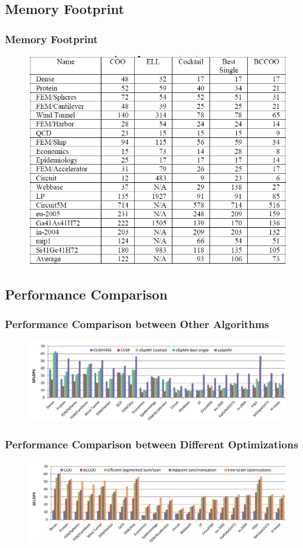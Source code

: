 \subsection{Memory Footprint}
\begin{frame}
	\frametitle{Memory Footprint}
	\begin{figure}
		\includegraphics[scale=0.4]{figure/fig6-memoryprint.png}
	\end{figure}
\end{frame}

\subsection{Performance Comparison}
\begin{frame}
	\frametitle{Performance Comparison between Other Algorithms}
	\begin{figure}
		\includegraphics[scale=0.25]{figure/fig7-exp1.png}
	\end{figure}
\end{frame}

\begin{frame}
	\frametitle{Performance Comparison between Different Optimizations}
	\begin{figure}
		\includegraphics[scale=0.25]{figure/fig8-exp2.png}
	\end{figure}
\end{frame}